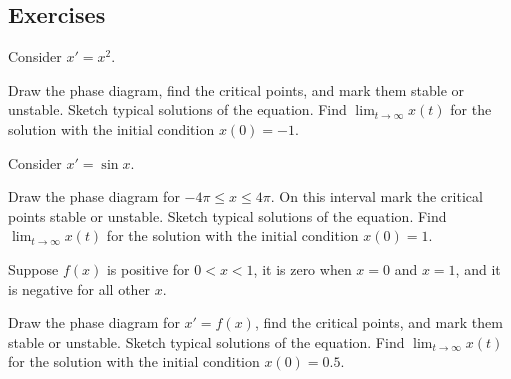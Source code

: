 \begin{myfig}
\capstart
{}
\caption{The slope field and some solutions of
$x' = 0.1\,x\,(8-x)-2$.\label{2.2:harv2}}
\end{myfig}


\subsection{Exercises}

\begin{samepage}
\begin{exercise}
Consider $x' = x^2$.
\begin{tasks}
\task Draw the phase diagram,
find the critical points, and mark them stable or unstable.
\task Sketch typical solutions of the equation.
\task Find $\displaystyle \lim_{t\to \infty} x(t)$ for the solution with the initial condition
$x(0) = -1$.
\end{tasks}
\end{exercise}
\end{samepage}

\begin{exercise}
Consider $x' = \sin x$.
\begin{tasks}
\task Draw the phase diagram for $-4\pi \leq x \leq 4\pi$.  On this interval
mark the critical points stable or unstable.
\task Sketch typical solutions of the equation.
\task Find $\displaystyle \lim_{t\to \infty} x(t)$ for the solution with the initial condition
$x(0) = 1$.
\end{tasks}
\end{exercise}

\begin{exercise}
Suppose $f(x)$ is positive for $0 < x < 1$, it is zero when $x=0$ and $x=1$,
and it is negative for all other $x$.
\begin{tasks}
\task Draw the phase diagram for $x' = f(x)$,
find the critical points, and mark them stable or unstable.
\task Sketch typical solutions of the equation.
\task Find $\displaystyle \lim_{t\to \infty} x(t)$ for the solution with the initial condition
$x(0) = 0.5$.
\end{tasks}
\end{exercise}

